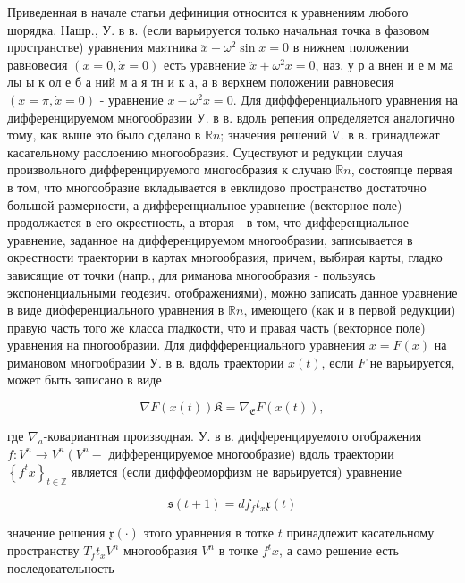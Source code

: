 \documentclass[10pt]{article}
\begin{document}
Приведенная в начале статьи дефиниция относится к уравнениям любого шорядка. Нашр., У. в в. (если варьируется только начальная точка в фазовом пространстве) уравнения маятника $\ddot{x}+\omega^{2} \sin x=0$ в нижнем положении равновесия $(x=0, \dot{x}=0)$ есть уравнение $\ddot{x}+\omega^{2} x=0$, наз. у р а внен и е м ма лы ы к ол е б а ний м а я тн и к а, а в верхнем положении равновесия $(x=\pi, \dot{x}=0)$ - уравнение $\ddot{x}-\omega^{2} x=0$. Для диффференциального уравнения на дифференцируемом многообразии У. в в. вдоль репения определяется аналогично тому, как выше это было сделано в $\mathbb{R} n$; значения решений $\mathrm{V}$. в в. гринадлежат касательному расслоению многообразия. Суцествуют и редукции случая произвольного дифференцируемого многообразия к случаю $\mathbb{R} n$, состояпце первая в том, что многообразие вкладывается в евклидово пространство достаточно большой размерности, а дифференциальное уравнение (векторное поле) продолжается в его окрестность, а вторая - в том, что дифференциальное уравнение, заданное на дифференцируемом многообразии, записывается в окрестности траектории в картах многообразия, причем, выбирая карты, гладко зависящие от точки (напр., для риманова многообразия - пользуясь экспоненциальными геодезич. отображениями), можно записать данное уравнение в виде дифференциального уравнения в $\mathbb{R} n$, имеющего (как и в первой редукции) правую часть того же класса гладкости, что и правая часть (векторное поле) уравнения на пногообразии. Для диффференциального уравнения $\dot{x}=F(x)$ на римановом многообразии У. в в. вдоль траектории $x(t)$, если $F$ не варьируется, может быть записано в виде



\[

\nabla F(x(t)) \mathfrak{K}=\nabla_{\mathfrak{E}} F(x(t)),

\]



где $\nabla_{a}$-ковариантная производная. У. в в. дифференцируемого отображения $f: V^{n} \rightarrow V^{n}\left(V^{n}-\right.$ дифференцируемое многообразие) вдоль траектории $\left\{f^{t} x\right\}_{t \in \mathbb{Z}}$ является (если дифффеоморфизм не варьируется) уравнение



\[

\mathfrak{s}(t+1)=d f_{f} t_{x} \mathfrak{x}(t)

\]



значение решения $\mathfrak{x}(\cdot)$ этого уравнения в тотке $t$ принадлежит касательному пространству $T_{f} t_{x} V^{n}$ многообразия $V^{n}$ в точке $f^{t} x$, а само решение есть последовательность
\end{document}
